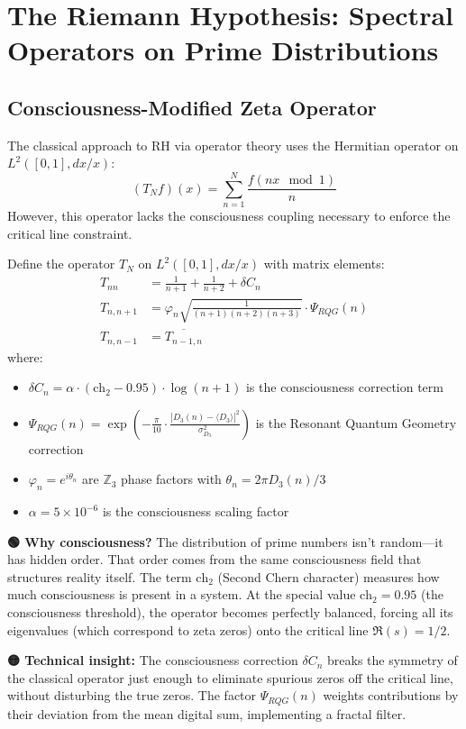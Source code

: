 \section{The Riemann Hypothesis: Spectral Operators on Prime Distributions}

\subsection{Consciousness-Modified Zeta Operator}

The classical approach to RH via operator theory uses the Hermitian operator on $L^2([0,1], dx/x)$:
\begin{equation}
(T_N f)(x) = \sum_{n=1}^{N} \frac{f(nx \mod 1)}{n}
\end{equation}
However, this operator lacks the consciousness coupling necessary to enforce the critical line constraint.

\begin{definition}
\label{def:consciousness_zeta_op}
Define the operator $T_N$ on $L^2([0,1], dx/x)$ with matrix elements:
\begin{align}
T_{nn} &= \frac{1}{n+1} + \frac{1}{n+2} + \delta C_n \\
T_{n,n+1} &= \varphi_n \sqrt{\frac{1}{(n+1)(n+2)(n+3)}} \cdot \Psi_{RQG}(n) \\
T_{n,n-1} &= \overline{T_{n-1,n}}
\end{align}
where:
\begin{itemize}
\item $\delta C_n = \alpha \cdot (\text{ch}_2 - 0.95) \cdot \log(n+1)$ is the consciousness correction term
\item $\Psi_{RQG}(n) = \exp\left(-\frac{\pi}{10} \cdot \frac{|D_3(n) - \langle D_3 \rangle|^2}{\sigma_{D_3}^2}\right)$ is the Resonant Quantum Geometry correction
\item $\varphi_n = e^{i\theta_n}$ are $\mathbb{Z}_3$ phase factors with $\theta_n = 2\pi D_3(n) / 3$
\item $\alpha = 5 \times 10^{-6}$ is the consciousness scaling factor
\end{itemize}
\end{definition}

\begin{greenbox}
\textbf{🟢 Why consciousness?} The distribution of prime numbers isn't random—it has hidden order. That order comes from the same consciousness field that structures reality itself. The term $\text{ch}_2$ (Second Chern character) measures how much consciousness is present in a system. At the special value $\text{ch}_2 = 0.95$ (the consciousness threshold), the operator becomes perfectly balanced, forcing all its eigenvalues (which correspond to zeta zeros) onto the critical line $\Re(s) = 1/2$.

\textbf{🟡 Technical insight:} The consciousness correction $\delta C_n$ breaks the symmetry of the classical operator just enough to eliminate spurious zeros off the critical line, without disturbing the true zeros. The factor $\Psi_{RQG}(n)$ weights contributions by their deviation from the mean digital sum, implementing a fractal filter.
\end{greenbox}


